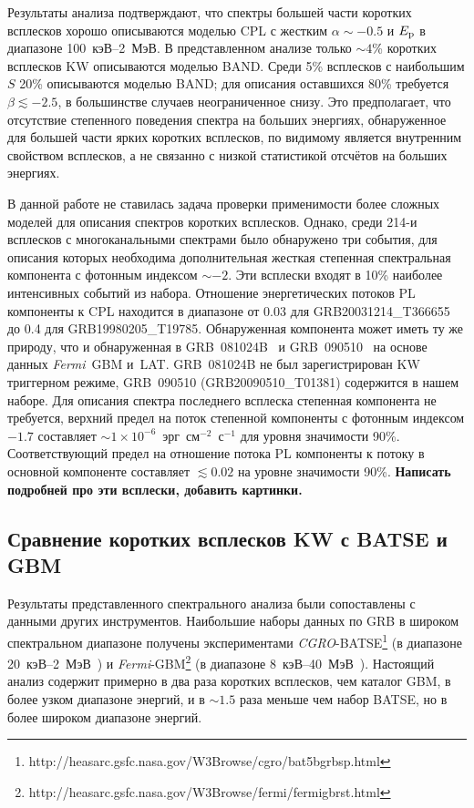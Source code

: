 

Результаты анализа подтверждают, что спектры большей части коротких всплесков хорошо
описываются моделью CPL с жестким $\alpha \sim -0.5$ и $E_{\mathrm{p}}$ в диапазоне 100~кэВ--2~МэВ.
В представленном анализе только $\sim 4$\% коротких всплесков KW описываются моделью BAND.
Среди 5\%  всплесков с наибольшим $S$ 20\% описываются моделью BAND; для описания 
оставшихся 80\% требуется $\beta \lesssim -2.5$, в большинстве случаев неограниченное снизу.
Это предполагает, что отсутствие степенного поведения спектра на больших энергиях,
обнаруженное для большей части ярких коротких всплесков, по видимому является внутренним
свойством всплесков, а не связанно с низкой статистикой отсчётов на больших энергиях.

В данной работе не ставилась задача проверки применимости более сложных моделей
для описания спектров коротких всплесков.
Однако, среди 214-и всплесков с многоканальными спектрами было обнаружено три
события, для описания которых необходима дополнительная жесткая степенная 
спектральная компонента с фотонным индексом $\sim -2$. Эти всплески входят в 10\%
наиболее интенсивных событий из набора. Отношение энергетических потоков PL
компоненты к CPL находится в диапазоне от 0.03 для GRB20031214\_T366655 до
0.4 для GRB19980205\_T19785. Обнаруженная компонента может иметь ту же природу,
что и обнаруженная в GRB~081024B~\citep{Abdo_2010ApJ_712_558A} и 
GRB~090510~\citep{Ackermann_2010ApJ_716_1178A} на основе данных \textit{Fermi}~GBM и~LAT.
GRB~081024B не был зарегистрирован KW триггерном режиме, GRB~090510 (GRB20090510\_T01381)
содержится в нашем наборе. Для описания спектра последнего всплеска степенная 
компонента не требуется, верхний предел на поток степенной компоненты с фотонным 
индексом $-1.7$ составляет $\sim 1 \times 10^{-6}$~эрг~см$^{-2}$~с$^{-1}$ для 
уровня значимости 90\%. Соответствующий предел на отношение потока PL компоненты 
к потоку в основной компоненте составляет $\lesssim 0.02$ на уровне значимости 90\%.
\textbf{Написать подробней про эти всплески, добавить картинки.}

\subsection{Сравнение коротких всплесков KW с BATSE и GBM}
Результаты представленного спектрального анализа были сопоставлены с данными
других инструментов.
Наибольшие наборы данных по GRB в широком спектральном диапазоне получены экспериментами
\textit{CGRO}-BATSE\footnote{http://heasarc.gsfc.nasa.gov/W3Browse/cgro/bat5bgrbsp.html}
(в диапазоне 20~кэВ--2~МэВ~\citep{Goldstein_2013ApJS}) и 
\textit{Fermi}-GBM\footnote{http://heasarc.gsfc.nasa.gov/W3Browse/fermi/fermigbrst.html}
(в диапазоне 8~кэВ--40~МэВ~\citep{Gruber_2014ApJS}). 
Настоящий анализ содержит примерно в два раза коротких всплесков, чем каталог GBM, 
в более узком диапазоне энергий, и в $\sim 1.5 $ раза меньше чем набор BATSE, 
но в более широком диапазоне энергий.

